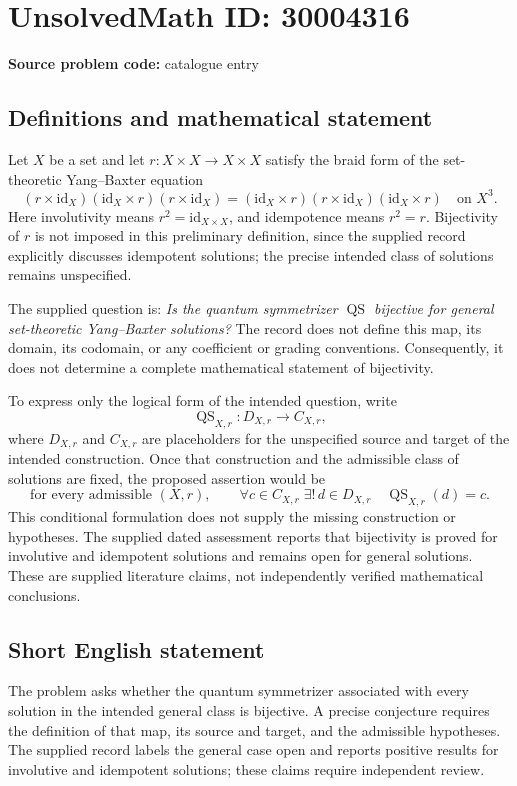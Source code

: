 \documentclass[11pt]{article}
\begin{document}
\section*{UnsolvedMath ID: 30004316}
\textbf{Source problem code:} catalogue entry
\subsection{Definitions and mathematical statement}
Let \(X\) be a set and let \(r:X\times X\to X\times X\) satisfy the braid form of the set-theoretic Yang--Baxter equation
\[
(r\times\mathrm{id}_X)(\mathrm{id}_X\times r)(r\times\mathrm{id}_X)
=
(\mathrm{id}_X\times r)(r\times\mathrm{id}_X)(\mathrm{id}_X\times r)
\quad\text{on }X^3.
\]
Here involutivity means \(r^2=\mathrm{id}_{X\times X}\), and idempotence means \(r^2=r\). Bijectivity of \(r\) is not imposed in this preliminary definition, since the supplied record explicitly discusses idempotent solutions; the precise intended class of solutions remains unspecified.

The supplied question is: \emph{Is the quantum symmetrizer \(\operatorname{QS}\) bijective for general set-theoretic Yang--Baxter solutions?} The record does not define this map, its domain, its codomain, or any coefficient or grading conventions. Consequently, it does not determine a complete mathematical statement of bijectivity.

To express only the logical form of the intended question, write
\[
\operatorname{QS}_{X,r}:D_{X,r}\longrightarrow C_{X,r},
\]
where \(D_{X,r}\) and \(C_{X,r}\) are placeholders for the unspecified source and target of the intended construction. Once that construction and the admissible class of solutions are fixed, the proposed assertion would be
\[
\text{for every admissible }(X,r),\qquad
\forall c\in C_{X,r}\;\exists!\,d\in D_{X,r}
\quad \operatorname{QS}_{X,r}(d)=c.
\]
This conditional formulation does not supply the missing construction or hypotheses. The supplied dated assessment reports that bijectivity is proved for involutive and idempotent solutions and remains open for general solutions. These are supplied literature claims, not independently verified mathematical conclusions.
\subsection{Short English statement}
The problem asks whether the quantum symmetrizer associated with every solution in the intended general class is bijective. A precise conjecture requires the definition of that map, its source and target, and the admissible hypotheses. The supplied record labels the general case open and reports positive results for involutive and idempotent solutions; these claims require independent review.
\end{document}
